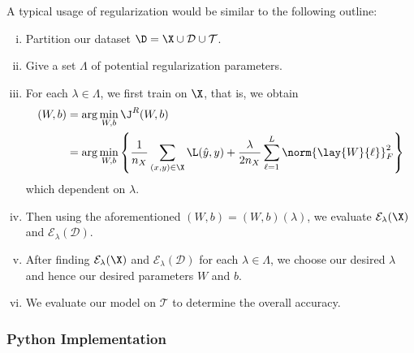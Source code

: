 A typical usage of regularization would be similar to the following outline:
\begin{enumerate}[i.]
	\item Partition our dataset $\D=\X\cup\mathcal{D}\cup\mathcal{T}$.
	\item Give a set $\Lambda$ of potential regularization parameters.
	\item For each $\lambda\in\Lambda$, we first train on $\X$, that is, we obtain
		\begin{align*}
			(W,b)&=\arg\min_{W,b}\J^R(W,b)\\
			&=\arg\min_{W,b}\left\{\frac{1}{n_X}\sum_{(x,y)\in\X}\L(\hat{y},y)+\frac{\lambda}{2n_X}\sum_{\ell=1}^L\norm{\lay{W}{\ell}}_F^2\right\}
		\end{align*}
		which dependent on $\lambda$.
	\item Then using the aforementioned $(W,b)=(W,b)(\lambda)$, we evaluate $\mathcal{E}_\lambda(\X)$ and $\mathcal{E}_\lambda(\mathcal{D})$.
	\item After finding $\mathcal{E}_\lambda(\X)$ and $\mathcal{E}_\lambda(\mathcal{D})$ for each $\lambda\in\Lambda$, we choose our desired $\lambda$ and hence our desired parameters $W$ and $b$.
	\item We evaluate our model on $\mathcal{T}$ to determine the overall accuracy.
\end{enumerate}


\subsubsection{Python Implementation}



